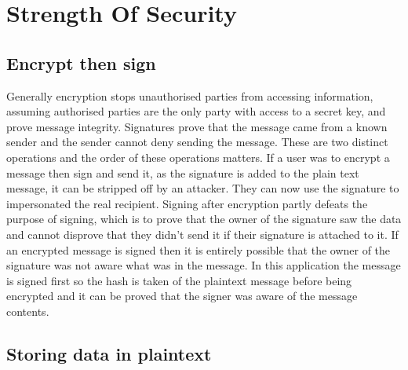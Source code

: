 
\chapter{Strength Of Security}
\label{stre}


\section{Encrypt then sign}

Generally encryption stops unauthorised parties from accessing information, assuming authorised parties are the only party with access to a secret key, and prove message integrity. Signatures prove that the message came from a known sender and the sender cannot deny sending the message. These are two distinct operations and the order of these operations matters. If a user was to encrypt a message then sign and send it, as the signature is added to the plain text message, it can be stripped off by an attacker. They can now use the signature to impersonated the real recipient. Signing after encryption partly defeats the purpose of signing, which is to prove that the owner of the signature saw the data and cannot disprove that they didn't send it if their signature is attached to it. If an encrypted message is signed then it is entirely possible that the owner of the signature was not aware what was in the message. In this application the message is signed first so the hash is taken of the plaintext message before being encrypted and it can be proved that the signer was aware of the message contents\cite{signencrypt}.


\section{Storing data in plaintext}

